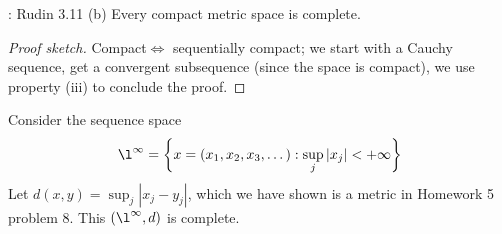 \begin{ntheorem}{: Rudin 3.11 (b)}
	Every compact metric space is complete.
\end{ntheorem}
\begin{proof}[Proof sketch]
	Compact\(\iff\) sequentially compact; we start with a Cauchy sequence, get a convergent subsequence (since the space is compact), we use property (iii) to conclude the proof.
\end{proof}
\begin{example}
	Consider the sequence space 
	\begin{equation*}
		\l^{\infty}=\left\{x=(x_1,x_2,x_3,\dots)\mathrel{:}\sup_j|x_j|<+\infty\right\}
	\end{equation*}
	Let \(d(x,y)=\displaystyle\sup_j|x_j-y_j|\), which we have shown is a metric in Homework 5 problem 8. This \((\l^{\infty},d)\) is complete.
\end{example}
